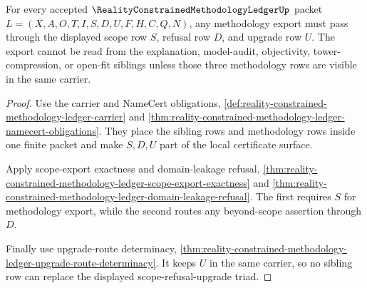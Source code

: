 \begin{theorem}
\label{thm:reality-constrained-methodology-ledger-scope-refusal-triad}
For every accepted $\RealityConstrainedMethodologyLedgerUp$ packet
$L=(X,A,O,T,I,S,D,U,F,H,C,Q,N)$, any methodology export must pass through the
displayed scope row $S$, refusal row $D$, and upgrade row $U$. The export
cannot be read from the explanation, model-audit, objectivity,
tower-compression, or open-fit siblings unless those three methodology rows are
visible in the same carrier.
\end{theorem}
\begin{proof}
Use the carrier and NameCert obligations,
\autoref{def:reality-constrained-methodology-ledger-carrier} and
\autoref{thm:reality-constrained-methodology-ledger-namecert-obligations}. They
place the sibling rows and methodology rows inside one finite packet and make
$S,D,U$ part of the local certificate surface.

Apply scope-export exactness and domain-leakage refusal,
\autoref{thm:reality-constrained-methodology-ledger-scope-export-exactness}
and
\autoref{thm:reality-constrained-methodology-ledger-domain-leakage-refusal}.
The first requires $S$ for methodology export, while the second routes any
beyond-scope assertion through $D$.

Finally use upgrade-route determinacy,
\autoref{thm:reality-constrained-methodology-ledger-upgrade-route-determinacy}.
It keeps $U$ in the same carrier, so no sibling row can replace the displayed
scope-refusal-upgrade triad.
\end{proof}

